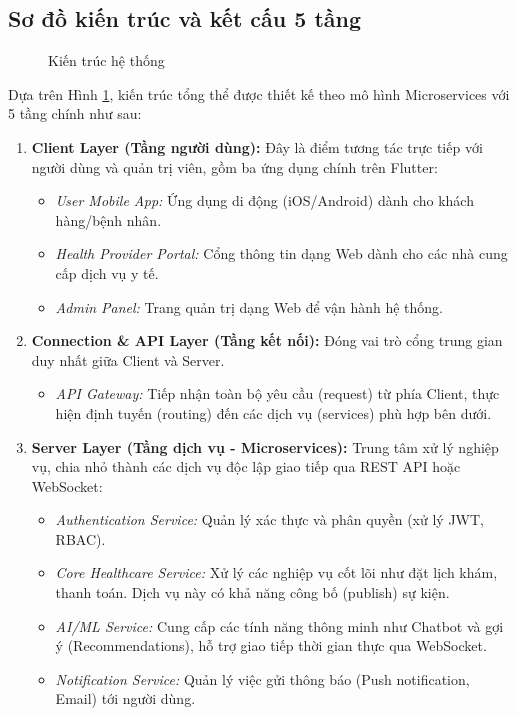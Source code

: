 \subsection{Sơ đồ kiến trúc và kết cấu 5 tầng}
\begin{figure}[H]
    \centering
    \vspace{10pt}
    
    \caption{Kiến trúc hệ thống}
    
    \label{fig:sys_arch}
\end{figure}
Dựa trên Hình \ref{fig:sys_arch}, kiến trúc tổng thể được thiết kế theo mô hình Microservices với 5 tầng chính như sau:
\begin{enumerate}
    \item \textbf{Client Layer (Tầng người dùng):}
    Đây là điểm tương tác trực tiếp với người dùng và quản trị viên, gồm ba ứng dụng chính trên Flutter:
    \begin{itemize}
        \item \textit{User Mobile App:} Ứng dụng di động (iOS/Android) dành cho khách hàng/bệnh nhân.
        \item \textit{Health Provider Portal:} Cổng thông tin dạng Web dành cho các nhà cung cấp dịch vụ y tế.
        \item \textit{Admin Panel:} Trang quản trị dạng Web để vận hành hệ thống.
    \end{itemize}

    \item \textbf{Connection \& API Layer (Tầng kết nối):}
    Đóng vai trò cổng trung gian duy nhất giữa Client và Server.
    \begin{itemize}
        \item \textit{API Gateway:} Tiếp nhận toàn bộ yêu cầu (request) từ phía Client, thực hiện định tuyến (routing) đến các dịch vụ (services) phù hợp bên dưới.
    \end{itemize}

    \item \textbf{Server Layer (Tầng dịch vụ - Microservices):}
    Trung tâm xử lý nghiệp vụ, chia nhỏ thành các dịch vụ độc lập giao tiếp qua REST API hoặc WebSocket:
    \begin{itemize}
        \item \textit{Authentication Service:} Quản lý xác thực và phân quyền (xử lý JWT, RBAC).
        \item \textit{Core Healthcare Service:} Xử lý các nghiệp vụ cốt lõi như đặt lịch khám, thanh toán. Dịch vụ này có khả năng công bố (publish) sự kiện.
        \item \textit{AI/ML Service:} Cung cấp các tính năng thông minh như Chatbot và gợi ý (Recommendations), hỗ trợ giao tiếp thời gian thực qua WebSocket.
        \item \textit{Notification Service:} Quản lý việc gửi thông báo (Push notification, Email) tới người dùng.
    \end{itemize}


\end{enumerate}
